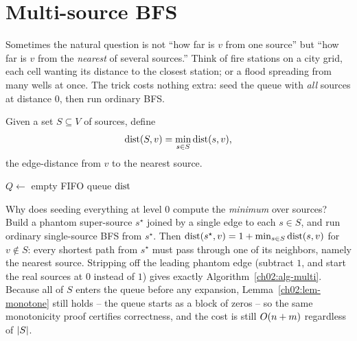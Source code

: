 \section{Multi-source BFS}
\label{ch02:multisource}

Sometimes the natural question is not ``how far is $v$ from one source'' but
``how far is $v$ from the \emph{nearest} of several sources.'' Think of fire
stations on a city grid, each cell wanting its distance to the closest station;
or a flood spreading from many wells at once. The trick costs nothing extra:
seed the queue with \emph{all} sources at distance $0$, then run ordinary BFS.

\begin{definition}
\label{ch02:def-multisrc}
Given a set $S\subseteq V$ of sources, define
\[
  \operatorname{dist}(S,v) = \min_{s\in S}\operatorname{dist}(s,v),
\]
the edge-distance from $v$ to the nearest source.
\end{definition}

\begin{algorithm}[H]
\DontPrintSemicolon
{}
$Q\gets$ empty FIFO queue\;
\Return $\operatorname{dist}$\;
\caption{\textsc{MultiSourceBfs}$(\Gph,S)$}
\label{ch02:alg-multi}
\end{algorithm}

\begin{whybox}
Why does seeding everything at level $0$ compute the \emph{minimum} over sources?
Build a phantom super-source $s^\star$ joined by a single edge to each $s\in S$,
and run ordinary single-source BFS from $s^\star$. Then $\operatorname{dist}(s^\star,v)=
1+\min_{s\in S}\operatorname{dist}(s,v)$ for $v\notin S$: every shortest path from $s^\star$
must pass through one of its neighbors, namely the nearest source. Stripping off
the leading phantom edge (subtract $1$, and start the real sources at $0$ instead
of $1$) gives exactly Algorithm~\ref{ch02:alg-multi}. Because all of $S$ enters
the queue before any expansion, Lemma~\ref{ch02:lem-monotone} still holds -- the
queue starts as a block of zeros -- so the same monotonicity proof certifies
correctness, and the cost is still $O(n+m)$ regardless of $\lvert S\rvert$.
\end{whybox}


